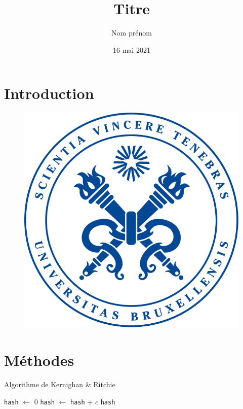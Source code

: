 \documentclass[utf8]{article}
\title{Titre}
\author{Nom prénom}
\date{16 mai 2021}
\begin{document}
\maketitle
\tableofcontents

\newpage


\section{Introduction}


\begin{figure}[H]
  \centering
	\includegraphics[scale=0.4]{img/logo.png}
  \label{fig:logo}
\end{figure}

\section{Méthodes}

\begin{algorithm}
\caption{Algorithme de Kernighan \& Ritchie}
\begin{algorithmic}[1]
\State \verb+hash+ $\gets$ 0
  \State \verb+hash+ $\gets$ \verb+hash+ + $c$
\EndFor
\State \Return \verb+hash+
\EndProcedure
\end{algorithmic}
\end{algorithm}
\end{document}
